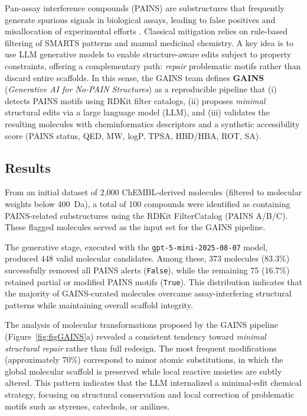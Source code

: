 Pan-assay interference compounds (PAINS) are substructures that frequently generate spurious signals in biological assays, leading to false positives and misallocation of experimental efforts \cite{Baell2010,Baell2014}. Classical mitigation relies on rule-based filtering of SMARTS patterns and manual medicinal chemistry.
A key idea is to use LLM generative models to enable structure-aware edits subject to property constraints, offering a complementary path: \emph{repair} problematic motifs rather than discard entire scaffolds.
In this sense, the GAINS team defines \textbf{GAINS} (\emph{Generative AI for No-PAIN Structures}) as a reproducible pipeline that (i) detects PAINS motifs using RDKit filter catalogs, (ii) proposes \emph{minimal} structural edits via a large language model (LLM), and (iii) validates the resulting molecules with cheminformatics descriptors and a synthetic accessibility score (PAINS status, QED, MW, logP, TPSA, HBD/HBA, ROT, SA).

\subsection*{Results}
From an initial dataset of 2,000 ChEMBL-derived molecules (filtered to molecular weights below 400~Da), a total of 100 compounds were identified as containing PAINS-related substructures using the RDKit FilterCatalog (PAINS A/B/C). These flagged molecules served as the input set for the GAINS pipeline.

The generative stage, executed with the \texttt{gpt-5-mini-2025-08-07} model, produced 448 valid molecular candidates. Among these, 373 molecules (83.3\%) successfully removed all PAINS alerts (\texttt{False}), while the remaining 75 (16.7\%) retained partial or modified PAINS motifs (\texttt{True}). This distribution indicates that the majority of GAINS-curated molecules overcame assay-interfering structural patterns while maintaining overall scaffold integrity.

The analysis of molecular transformations proposed by the GAINS pipeline (Figure~\ref{fig:figGAINS}a) revealed a consistent tendency toward \emph{minimal structural repair} rather than full redesign. The most frequent modifications (approximately 70\%) correspond to minor atomic substitutions, in which the global molecular scaffold is preserved while local reactive moieties are subtly altered. This pattern indicates that the LLM internalized a minimal-edit chemical strategy, focusing on structural conservation and local correction of problematic motifs such as styrenes, catechols, or anilines.


